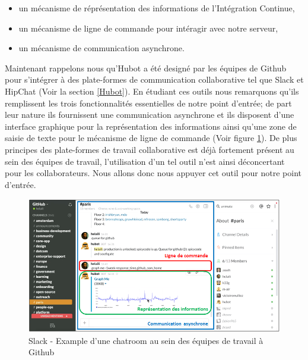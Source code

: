        \begin{itemize}
          \item un mécanisme de réprésentation des informations de l'Intégration Continue,
          \item un mécanisme de ligne de commande pour intéragir avec notre serveur,
          \item un mécanisme de communication asynchrone.\\
        \end{itemize}

        Maintenant rappelons nous qu'Hubot a été designé par les équipes de Github pour s'intégrer à des plate-formes de communication collaborative tel que Slack et HipChat (Voir la section \ref{Hubot}). En étudiant ces outils nous remarquons qu'ils remplissent les trois fonctionnalités essentielles de notre point d'entrée; de part leur nature ils fournissent une communication asynchrone et ils disposent d'une interface graphique pour la représentation des informations ainsi qu'une zone de saisie de texte pour le mécanisme de ligne de commande (Voir figure {\ref{Slack}}). De plus principes des plate-formes de travail collaborative est déjà fortement présent au sein des équipes de travail, l'utilisation d'un tel outil n'est ainsi déconcertant pour les collaborateurs. Nous allons donc nous appuyer cet outil pour notre point d'entrée.\\

        \begin{figure}
          \begin{center}
            \includegraphics[scale=0.5]{images/Slack.png}
          \end{center}
          \caption{Slack - Example d'une chatroom au sein des équipes de travail à Github}
          \label{Slack}
        \end{figure}

